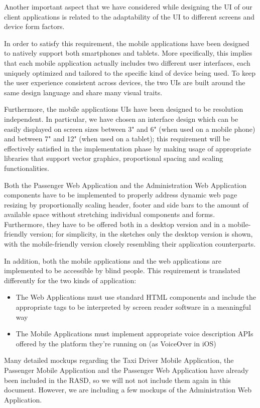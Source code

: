 Another important aspect that we have considered while designing the UI of our client applications is related to the adaptability of the UI to different screens and device form factors. 

In order to satisfy this requirement, the mobile applications have been designed to natively support both smartphones and tablets. More specifically, this implies that each mobile application actually includes two different user interfaces, each uniquely optimized and tailored to the specific kind of device being used. To keep the user experience consistent across devices, the two UIs are built around the same design language and share many visual traits. 

Furthermore, the mobile applications UIs have been designed to be resolution independent. In particular, we have chosen an interface design which can be easily displayed on screen sizes between 3" and 6" (when used on a mobile phone) and between 7" and 12" (when used on a tablet); this requirement will be effectively satisfied in the implementation phase by making usage of appropriate libraries that support vector graphics, proportional spacing and scaling functionalities.

Both the Passenger Web Application and the Administration Web Application components have to be implemented to properly address dynamic web page resizing by proportionally scaling header, footer and side bars to the amount of available space without stretching individual components and forms. Furthermore, they have to be offered both in a desktop version and in a mobile-friendly version; for simplicity, in the sketches only the desktop version is shown, with the mobile-friendly version closely resembling their application counterparts. 

In addition, both the mobile applications and the web applications are implemented to be accessible by blind people. This requirement is translated differently for the two kinds of application:
	\begin{itemize}
	\item The Web Applications must use standard HTML components and include the appropriate tags to be interpreted by screen reader software in a meaningful way
	\item The Mobile Applications must implement appropriate voice description APIs offered by the platform they're running on (as VoiceOver in iOS)
	\end{itemize}

Many detailed mockups regarding the Taxi Driver Mobile Application, the Passenger Mobile Application and the Passenger Web Application have already been included in the RASD, so we will not not include them again in this document. 
However, we are including a few mockups of the Administration Web Application. 


